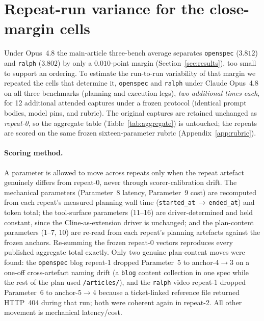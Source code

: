 \section{Repeat-run variance for the close-margin cells}
\label{app:variance}

Under Opus~4.8 the main-article three-bench average separates
\texttt{openspec} ($3.812$) and \texttt{ralph} ($3.802$) by only a
$0.010$-point margin (Section~\ref{sec:results}), too small to support an
ordering. To estimate the run-to-run
variability of that margin we repeated the cells that determine it,
\texttt{openspec} and \texttt{ralph} under Claude Opus~4.8 on all three
benchmarks (planning and execution legs), \emph{two additional times each},
for 12 additional attended captures under a frozen protocol (identical prompt
bodies, model pins, and rubric). The original captures are retained unchanged as
\emph{repeat-0}, so the aggregate table (Table~\ref{tab:aggregate}) is
untouched; the repeats are scored on the same frozen sixteen-parameter rubric
(Appendix~\ref{app:rubric}).

\paragraph{Scoring method.}
A parameter is allowed to move across repeats only when the repeat artefact
genuinely differs from repeat-0, never through scorer-calibration drift. The
mechanical parameters (Parameter~8 latency, Parameter~9 cost) are recomputed from
each repeat's measured planning wall time (\texttt{started\_at}\,$\to$\,\texttt{ended\_at})
and token total; the tool-surface parameters (11--16) are driver-determined and
held constant, since the Cline-as-extension driver is unchanged; and the
plan-content parameters (1--7, 10) are re-read from each repeat's planning
artefacts against the frozen anchors. Re-summing the frozen repeat-0 vectors
reproduces every published aggregate total exactly. Only two genuine
plan-content moves were found: the \texttt{openspec} blog repeat-1 dropped
Parameter~5 to anchor-4$\to$3 on a one-off cross-artefact naming drift (a
\texttt{blog} content collection in one spec while the rest of the plan used
\texttt{/articles/}), and the \texttt{ralph} video repeat-1 dropped Parameter~6
to anchor-5$\to$4 because a ticket-linked reference file returned HTTP~404 during
that run; both were coherent again in repeat-2. All other movement is mechanical
latency/cost.

